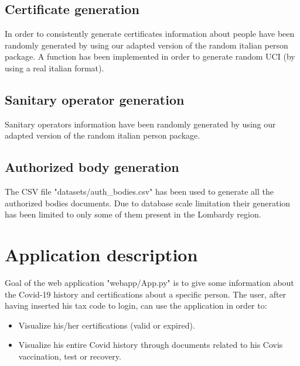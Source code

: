 \documentclass{article}
\begin{document}
\subsection{Certificate generation}
In order to consistently generate certificates information about people have been randomly generated by using our adapted version of the random italian person package. A function has been implemented in order to generate random UCI (by using a real italian format).

\subsection{Sanitary operator generation}
Sanitary operators information have been randomly generated by using our adapted version of the random italian person package.

\subsection{Authorized body generation}
The CSV file {\selectfont"datasets/auth\_bodies.csv"} has been used to generate all the authorized bodies documents. Due to database scale limitation their generation has been limited to only some of them present in the Lombardy region.


\newpage
\section{Application description}
Goal of the web application {\selectfont"webapp/App.py"} is to give some information about the Covid-19 history and certifications about a specific person.
The user, after having inserted his tax code to login, can use the application in order to:
\begin{itemize}
    \item Visualize his/her certifications (valid or expired).
    \item Visualize his entire Covid history through documents related to his Covis vaccination, test or recovery.
\end{itemize}

\end{document}
